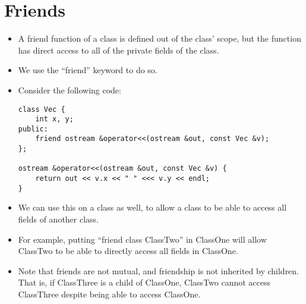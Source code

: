 \documentclass{article}
\author{Clement Tsang}
\begin{document}
\section{Friends}
\begin{itemize}
\item A friend function of a class is defined out of the class' scope, but the function has direct access to all of the private fields of the class.
\item We use the ``friend'' keyword to do so.
\item Consider the following code:
\begin{lstlisting}
class Vec {
    int x, y;
public:
    friend ostream &operator<<(ostream &out, const Vec &v); 
};

ostream &operator<<(ostream &out, const Vec &v) {
    return out << v.x << " " <<< v.y << endl;
}
\end{lstlisting}
\item We can use this on a class as well, to allow a class to be able to access all fields of another class. 
\item For example, putting ``friend class ClassTwo'' in ClassOne will allow ClassTwo to be able to directly access all fields in ClassOne.
\item Note that friends are not mutual, and friendship is not inherited by children.  That is, if ClassThree is a child of ClassOne, ClassTwo cannot access ClassThree despite being able to access ClassOne.
\end{itemize}
\end{document}
